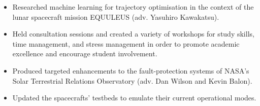 \documentclass[10pt,a4paper,ragged2e,withhyper]{altacv}
\begin{document}
\begin{paracol}{2}
\divider

\begin{itemize}
  \item Researched machine learning for trajectory optimisation in the context of the lunar spacecraft mission EQUULEUS (adv. Yasuhiro Kawakatsu).
\end{itemize}


\divider

\begin{itemize}
  \item Held consultation sessions and created a variety of workshops for study skills, time management, and stress management in order to promote academic excellence and encourage student involvement.
\end{itemize}

\divider

\begin{itemize}
  \item Produced targeted enhancements to the fault-protection systems of NASA's Solar Terrestrial Relations Observatory (adv. Dan Wilson and Kevin Balon).
  \item Updated the spacecrafts' testbeds to emulate their current operational modes.
\end{itemize}







\end{paracol}
\end{document}
